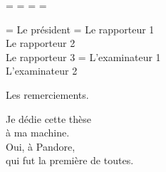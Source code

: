 \documentclass{thesul}
\begin{document}
      \OddHead={{\leftmark\rightmark}{\hfil\slshape\rightmark}}
      \EvenHead={{\leftmark}{{\slshape\leftmark}\hfil}}
      \OddFoot={\hfil\thepage}
      \EvenFoot={\thepage\hfil}
      \pagestyle{ThesisHeadingsII}


\ResetChaptersAtParts 





\MasterUL
{}
\President    = {Le pr\'esident}
\Rapporteurs  = {Le rapporteur 1\\
                 Le rapporteur 2\\
                 Le rapporteur 3}
\Examinateurs = {L'examinateur 1\\
                 L'examinateur 2}

\MakeThesisTitlePage



\begin{ThesisAcknowledgments}
Les remerciements.
\end{ThesisAcknowledgments}


\begin{ThesisDedication}
Je dédie cette thèse\\
à ma machine.\\
Oui, à Pandore,\\
qui fut la première de toutes.
\end{ThesisDedication}
\end{document}
